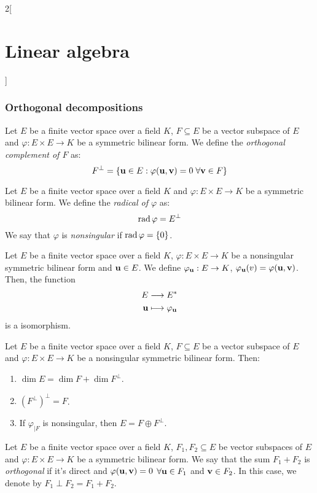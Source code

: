 \documentclass[../../../main.tex]{subfiles}
\begin{document}
\begin{multicols}{2}[\section{Linear algebra}]
\subsubsection*{Orthogonal decompositions}
\begin{definition}\label{ALG-singular}
    Let $E$ be a finite vector space over a field $K$, $F\subseteq E$ be a vector subspace of $E$ and $\varphi:E\times E\rightarrow K$ be a symmetric bilinear form. We define the \textit{orthogonal complement of $F$} as: $$F^\perp=\{\vb{u}\in E:\varphi(\vb{u},\vb{v})=0\;\forall\vb{v}\in F\}$$
\end{definition}
\begin{definition}
    Let $E$ be a finite vector space over a field $K$ and $\varphi:E\times E\rightarrow K$ be a symmetric bilinear form. We define the \textit{radical of $\varphi$} as: $$\operatorname{rad}\varphi=E^\perp$$ We say that $\varphi$ is \textit{nonsingular} if $\operatorname{rad}\varphi=\{0\}$.
\end{definition}
\begin{definition}
    Let $E$ be a finite vector space over a field $K$, $\varphi:E\times E\rightarrow K$ be a nonsingular symmetric bilinear form and $\vb{u}\in E$. We define $\varphi_{\vb{u}}:E\rightarrow K$, $\varphi_{\vb{u}}(v)=\varphi(\vb{u},\vb{v})$. Then, the function 
    \begin{align*}
        E&\longrightarrow E^*\\
        \vb{u}&\longmapsto\varphi_{\vb{u}}
    \end{align*} is a isomorphism. 
\end{definition}
\begin{definition}
    Let $E$ be a finite vector space over a field $K$, $F\subseteq E$ be a vector subspace of $E$ and $\varphi:E\times E\rightarrow K$ be a nonsingular symmetric bilinear form. Then:
    \begin{enumerate}
        \item $\dim E=\dim F+\dim F^\perp$.
        \item ${(F^\perp)}^\perp=F$.
        \item If $\varphi_{|F}$ is nonsingular, then $E=F\oplus F^\perp$.
    \end{enumerate}
\end{definition}
\begin{definition}
    Let $E$ be a finite vector space over a field $K$, $F_1,F_2\subseteq E$ be vector subspaces of $E$ and $\varphi:E\times E\rightarrow K$ be a symmetric bilinear form. We say that the sum $F_1+F_2$ is \textit{orthogonal} if it's direct and $\varphi(\vb{u},\vb{v})=0$ $\forall \vb{u}\in F_1$ and $\vb{v}\in F_2$. In this case, we denote by $F_1\perp F_2=F_1+F_2$.

\end{definition}
\end{multicols}
\end{document}
